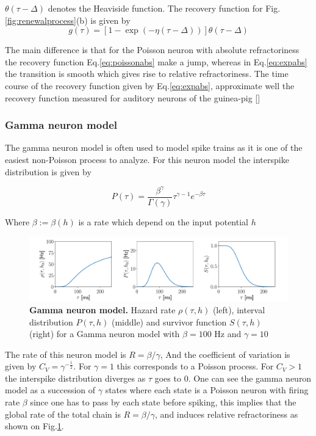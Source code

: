 \documentclass[12pt,twoside]{report}
\begin{document}
$\theta(\tau-\Delta)$ denotes the Heaviside function. The recovery function for Fig.\ref{fig:renewalprocess}(b) is given by
\begin{equation}
\label{eq:expabs}
g(\tau)=\left[1-\exp(-\eta(\tau-\Delta))\right]\theta(\tau-\Delta)
\end{equation}

The main difference is that for the Poisson neuron with absolute refractoriness the recovery function Eq.\eqref{eq:poissonabs} make a jump, whereas in Eq.\eqref{eq:expabs} the transition is smooth which gives rise to relative refractoriness. The time course of the recovery function given by Eq.\eqref{eq:expabs}, approximate well the recovery function measured for auditory neurons of the guinea-pig [\cite{Prij93}]


\subsubsection{Gamma neuron model}

The gamma neuron model is often used to model spike trains as it is one of the easiest non-Poisson process to analyze. For this neuron model the interspike distribution is given by

\begin{equation}
\label{eq:gamma}
P(\tau)=\frac{\beta^\gamma}{\Gamma(\gamma)}\tau^{\gamma-1}e^{-\beta\tau}
\end{equation}

Where $\beta:=\beta(h)$ is a rate which depend on the input potential $h$

\begin{figure}[h!]
	\includegraphics[width=\linewidth]{gamma.pdf}
	\caption{\textbf{Gamma neuron model.} Hazard rate $\rho(\tau,h)$ (left), interval distribution $P(\tau,h)$ (middle) and survivor function $S(\tau,h)$ (right) for a Gamma neuron model with $\beta=100$ Hz and $\gamma=10$ }
	\label{fig:gammaprocess}
\end{figure}

The rate of this neuron model is $R=\beta/\gamma$, And the coefficient of variation is given by $C_V=\gamma^{-\frac{1}{2}}$. For $\gamma=1$ this corresponds to a Poisson process. For $C_V>1$ the interspike distribution diverges as $\tau$ goes to $0$. One can see the gamma neuron model as a succession of $\gamma$ states where each state is  a Poisson neuron with firing rate $\beta$ since one has to pass by each state before spiking, this implies that the global rate of the total chain is $R=\beta/\gamma$, and induces relative refractoriness as shown on Fig.\ref{fig:gammaprocess}.
\end{document}
